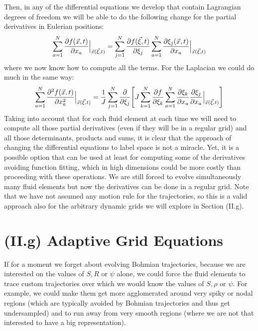 \documentclass[11pt, a4paper]{article} %
\begin{document}
Then, in any of the differential equations we develop that contain Lagrangian degrees of freedom we will be able to do the following change for the partial derivatives in Eulerian positions:
\begin{equation}
\sum_{a=1}^N \pdv{f(\vec{x},t)}{x_a}\Big\rvert_{\vec{x}(\vec{\xi},t)} = \sum_{j=1}^N \pdv{f(\vec{\xi},t)}{\xi_j} \sum_{a=1}^N \pdv{\xi_j(\vec{x},t)}{x_a}\Big\rvert_{\vec{x}(\vec{\xi},t)}
\end{equation}
where we now know how to compute all the terms. For the Laplacian we could do much in the same way:
\begin{equation}
\sum_{a=1}^N \pdv[2]{f(\vec{x},t)}{x_a}\Big\rvert_{\vec{x}(\vec{\xi},t)}=\frac{1}{J} \sum_{j=1}^N\pdv{}{\xi_j} \qty[ J\sum_{k=1}^N\pdv{f}{\xi_k}\sum_{a=1}^N\pdv{\xi_k}{x_a}\pdv{\xi_j}{x_a}\Big\rvert_{\vec{x}(\vec{\xi},t)}]
\end{equation}
Taking into account that for each fluid element at each time we will need to compute all those partial derivatives (even if they will be in a regular grid) and all those determinants, products and sums, it is clear that the approach of changing the differential equations to label space is not a miracle. Yet, it is a possible option that can be used at least for computing some of the derivatives avoiding function fitting, which in high dimensions could be more costly than proceeding with these operations. We are still forced to evolve simultaneously many fluid elements but now the derivatives can be done in a regular grid. Note that we have not assumed any motion rule for the trajectories, so this is a valid approach also for the arbitrary dynamic grids we will explore in Section (II.g).


\section*{(II.g) Adaptive Grid Equations\vspace{-0.2cm}}

If for a moment we forget about evolving Bohmian trajectories, because we are interested on the values of $S,R$ or $\psi$ alone, we could force the fluid elements to trace custom trajectories over which we would know the values of $S,\rho$ or $\psi$. For example, we could make them get more agglomerated around very spiky or nodal regions (which are typically avoided by Bohmian trajectories and thus get undersampled) and to run away from very smooth regions (where we are not that interested to have a big representation).
\end{document}
